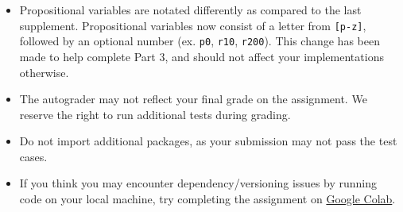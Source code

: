 \documentclass{article}
\begin{document}
    \begin{itemize}
        \item Propositional variables are notated differently as compared to the last supplement. Propositional variables now consist of a letter from \lstinline{[p-z]}, followed by an optional number (ex. \lstinline{p0}, \lstinline{r10}, \lstinline{r200}). This change has been made to help complete Part 3, and should not affect your implementations otherwise.
        \item The autograder may not reflect your final grade on the assignment. We reserve the right to run additional tests during grading.
        \item Do not import additional packages, as your submission may not pass the test cases.
        \item If you think you may encounter dependency/versioning issues by running code on your local machine, try completing the assignment on \href{https://colab.research.google.com/}{Google Colab}.
    \end{itemize}
\end{document}
